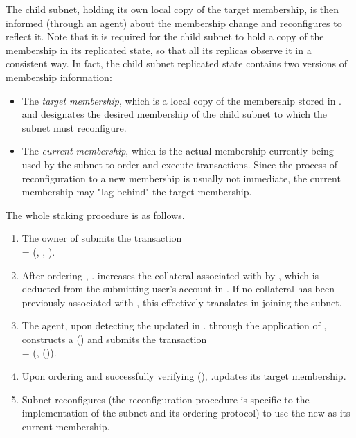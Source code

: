 The child subnet, holding its own local copy of the target membership, is then informed (through an \ipc agent) about the membership change and reconfigures to reflect it.
Note that it is required for the child subnet to hold a copy of the membership in its replicated state, so that all its replicas observe it in a consistent way.
In fact, the child subnet replicated state contains two versions of membership information:
\begin{itemize}
    \item The \emph{target membership}, which is a local copy of the membership stored in . and designates the desired membership of the child subnet
    to which the subnet must reconfigure.
    \item The \emph{current membership}, which is the actual membership currently being used by the subnet to order and execute transactions.
    Since the process of reconfiguration to a new membership is usually not immediate, the current membership may "lag behind" the target membership.
\end{itemize}
The whole staking procedure is as follows.

\begin{enumerate}

    \item The owner of  submits the transaction\\
     = (, , ).

    \item After ordering , . increases the collateral associated with  by ,
    which is deducted from the submitting user's account in .
    If no collateral has been previously associated with , this effectively translates in  joining the subnet.

    \item \label{item:update-membership} The \ipc agent, upon detecting the updated  in . through the application of ,
    constructs a {\pof}() and submits the transaction\\
     = (, {\pof}()).

    \item Upon ordering  and successfully verifying {\pof}(), .\gw updates its target membership.

    \item Subnet  reconfigures (the reconfiguration procedure is specific to the implementation of the subnet and its ordering protocol)
    to use the new  as its current membership.
    
\end{enumerate}

